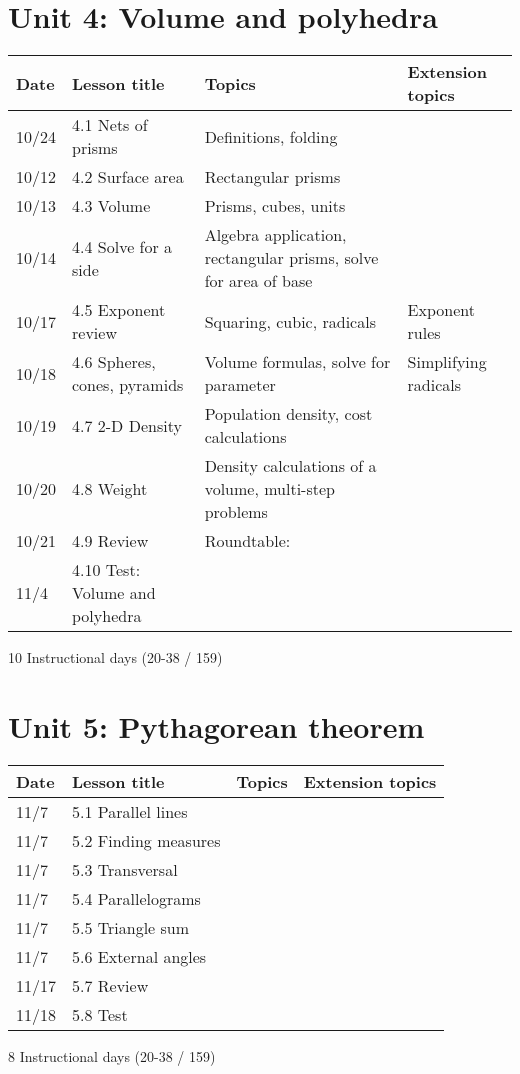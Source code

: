 \section*{Unit 4: Volume and polyhedra}
\begin{tabular}{|p{0.9cm}|p{4cm}|p{7cm}|p{5cm}|}
  \hline
  Date & Lesson title & Topics  & Extension topics \\
  \hline
  10/24 & 4.1 Nets of prisms & Definitions, folding &  \\
  \hline
  10/12 & 4.2 Surface area & Rectangular prisms &  \\
  \hline
  10/13 & 4.3 Volume & Prisms, cubes, units &  \\
  \hline
  10/14 & 4.4 Solve for a side & Algebra application, rectangular prisms, solve for area of base &  \\
  \hline
  10/17 & 4.5 Exponent review & Squaring, cubic, radicals & Exponent rules \\
  \hline
  10/18 & 4.6 Spheres, cones, pyramids & Volume formulas, solve for parameter & Simplifying radicals \\
  \hline
  10/19 & 4.7 2-D Density & Population density, cost calculations &  \\
  \hline
  10/20 & 4.8 Weight & Density calculations of a volume, multi-step problems & \\
  \hline
  10/21 & 4.9 Review & Roundtable: &  \\
  \hline
  11/4 & 4.10 Test: Volume and polyhedra &  &  \\
  \hline

\end{tabular} \par \vspace*{0.3cm}
10 Instructional days (20-38 / 159)


\section*{Unit 5: Pythagorean theorem}
\begin{tabular}{|p{0.9cm}|p{4cm}|p{7cm}|p{5cm}|}
  \hline
  Date & Lesson title & Topics  & Extension topics \\
  \hline
  11/7 & 5.1 Parallel lines &  &  \\
  \hline
  11/7 & 5.2 Finding measures &  &  \\
  \hline
  11/7 & 5.3 Transversal &  &  \\
  \hline
  11/7 & 5.4 Parallelograms &  &  \\
  \hline
  11/7 & 5.5 Triangle sum &  &  \\
  \hline
  11/7 & 5.6 External angles &  & \\
  \hline
  11/17 & 5.7 Review &  &  \\
  \hline
  11/18 & 5.8 Test &  & \\
  \hline

\end{tabular} \par \vspace*{0.3cm}
8 Instructional days (20-38 / 159)


